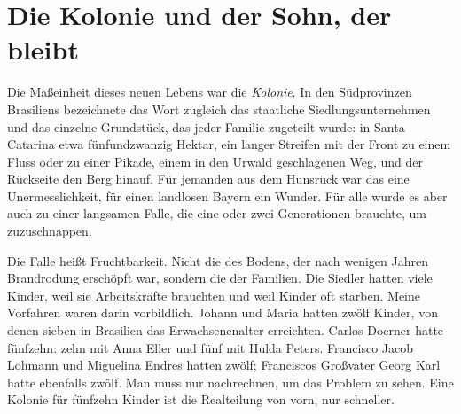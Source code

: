 \documentclass[
  ngerman,
  11pt,
  openany]{book}
\begin{document}
\section{Die Kolonie und der Sohn, der
bleibt}\label{die-kolonie-und-der-sohn-der-bleibt}

Die Maßeinheit dieses neuen Lebens war die \emph{Kolonie}. In den
Südprovinzen Brasiliens bezeichnete das Wort zugleich das staatliche
Siedlungsunternehmen und das einzelne Grundstück, das jeder Familie
zugeteilt wurde: in Santa Catarina etwa fünfundzwanzig Hektar, ein
langer Streifen mit der Front zu einem Fluss oder zu einer Pikade, einem
in den Urwald geschlagenen Weg, und der Rückseite den Berg hinauf. Für
jemanden aus dem Hunsrück war das eine Unermesslichkeit, für einen
landlosen Bayern ein Wunder. Für alle wurde es aber auch zu einer
langsamen Falle, die eine oder zwei Generationen brauchte, um
zuzuschnappen.

Die Falle heißt Fruchtbarkeit. Nicht die des Bodens, der nach wenigen
Jahren Brandrodung erschöpft war, sondern die der Familien. Die Siedler
hatten viele Kinder, weil sie Arbeitskräfte brauchten und weil Kinder
oft starben. Meine Vorfahren waren darin vorbildlich. Johann und Maria
hatten zwölf Kinder, von denen sieben in Brasilien das Erwachsenenalter
erreichten. Carlos Doerner hatte fünfzehn: zehn mit Anna Eller und fünf
mit Hulda Peters. Francisco Jacob Lohmann und Miguelina Endres hatten
zwölf; Franciscos Großvater Georg Karl hatte ebenfalls zwölf. Man muss
nur nachrechnen, um das Problem zu sehen. Eine Kolonie für fünfzehn
Kinder ist die Realteilung von vorn, nur schneller.
\end{document}
